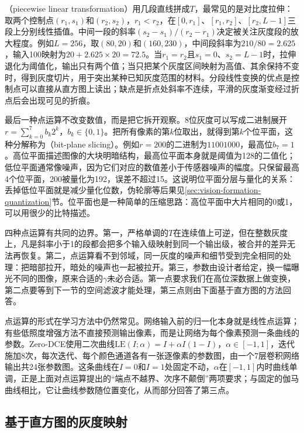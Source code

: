 （piecewise linear transformation）用几段直线拼成$T$，最常见的是对比度拉伸：取两个控制点$(r_1,s_1)$和$(r_2,s_2)$，$r_1<r_2$，在$[0,r_1]$、$[r_1,r_2]$、$[r_2,L-1]$三段上分别线性插值。中间一段的斜率$(s_2-s_1)/(r_2-r_1)$决定被关注灰度段的放大程度。例如$L=256$，取$(80,20)$和$(160,230)$，中间段斜率为$210/80=2.625$，输入100映射为$20+2.625\times20=72.5$。当$r_1=r_2$且$s_1=0$、$s_2=L-1$时，拉伸退化为阈值化，输出只有两个值；当只把某个灰度区间映射为高值、其余保持不变时，得到灰度切片，用于突出某种已知灰度范围的材料。分段线性变换的优点是控制点可以直接从直方图上读出；缺点是折点处斜率不连续，平滑的灰度渐变经过折点后会出现可见的折痕。

最后一种点运算不改变数值，而是把它拆开观察。8位灰度可以写成二进制展开$r=\sum_{k=0}^{7}b_k2^{k}$，$b_k\in\{0,1\}$。把所有像素的第$k$位取出，就得到第$k$个位平面，这种分解称为（bit-plane slicing）。例如$r=200$的二进制为$11001000$，最高位$b_7=1$。高位平面描述图像的大块明暗结构，最高位平面本身就是阈值为128的二值化；低位平面通常像噪声，因为它们对应的数值差小于传感器噪声的幅度。只保留最高4个位平面，200被量化为192，误差不超过15。这说明位平面分层与量化的关系：丢掉低位平面就是减少量化位数，伪轮廓等后果见\ref{sec:vision-formation-quantization}节。位平面也是一种简单的压缩思路：高位平面中大片相同的0或1，可以用很少的比特描述。

四种点运算有共同的边界。第一，严格单调的$T$在连续值上可逆，但在整数灰度上，凡是斜率小于1的段都会把多个输入级映射到同一个输出级，被合并的差异无法再恢复。第二，点运算看不到邻域，同一灰度的噪声和细节受到完全相同的处理：把暗部拉开，暗处的噪声也一起被拉开。第三，参数由设计者给定，换一幅曝光不同的图像，原来合适的$\gamma$未必合适。第一点要求我们在高位深数据上做变换，第二点要等到下一节的空间滤波才能处理，第三点则由下面基于直方图的方法回答。

点运算的形式在学习方法中仍然常见。网络输入前的归一化本身就是线性点运算；有些低照度增强方法不直接预测输出像素，而是让网络为每个像素预测一条曲线的参数。Zero-DCE使用二次曲线$\mathrm{LE}(I;\alpha)=I+\alpha I(1-I)$，$\alpha\in[-1,1]$，迭代施加8次，每次迭代、每个颜色通道各有一张逐像素的参数图，由一个7层卷积网络输出共24张参数图。这条曲线在$I=0$和$I=1$处固定不动，$\alpha$在$[-1,1]$内时曲线单调，正是上面对点运算提出的“端点不越界、次序不颠倒”两项要求；与固定的伽马曲线相比，它让曲线参数随位置变化，从而部分回答了第三点。

\subsection{基于直方图的灰度映射}
\label{sec:vision-transforms-histogram}

